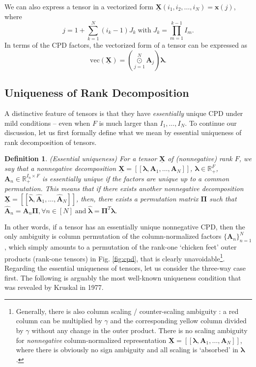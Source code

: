 \documentclass[journal]{IEEEtran}
\newtheorem{Def}{Definition}
\begin{document}
We can also express a tensor in a vectorized form $\underline{\mathbf{X}}(i_1,i_2,\ldots,i_N) = {\mathbf{x}}(j)$, where
\begin{equation*}
j = 1 + \sum_{k=1 }^N (i_k-1) J_k \; \text{with} \; J_k = \prod_{m=1}^{k-1} I_m.
\end{equation*}
In terms of the CPD factors, the vectorized form of a tensor can be expressed as
\begin{equation}
\text{vec}(\underline{\mathbf{X}})=  \left( { \underset{j=1}{ \overset{N}{\odot}}} \mathbf{A}_j \right) \boldsymbol{\lambda}.
\end{equation}

\subsection{Uniqueness of Rank Decomposition}
A distinctive feature of tensors is that they have \emph{essentially} unique CPD under mild conditions -- even when $F$ is much larger than $I_1,\ldots,I_N$.
To continue our discussion, let us first formally define what we mean by essential uniqueness of rank decomposition of tensors.
\begin{Def}
	(Essential uniqueness) For a tensor $\underline{\mathbf{X}}$ of (nonnegative) rank $F$, we say that a nonnegative decomposition $\underline{\mathbf{X}} = [\![{\bm \lambda}, \mathbf{A}_1, \ldots, \mathbf{A}_N ]\!]$, {$\boldsymbol{\lambda} \in \mathbb{R}_+^F$, $\mathbf{A}_n \in \mathbb{R}_+^{I_n \times F}$} is essentially unique if the factors are unique up to a common permutation. This means that if there exists another nonnegative decomposition $\underline{\mathbf{X}} = [\![ \widehat{\boldsymbol{\lambda}},\widehat{\mathbf{A}}_1, \ldots, \widehat{\mathbf{A}}_N ]\!]$, then, there exists a permutation matrix $\boldsymbol{\Pi}$ such that 
$
\widehat{\mathbf{A}}_n = \mathbf{A}_n \boldsymbol{\Pi}, \forall n\in[N] \; \text{and} \; \widehat{\boldsymbol{\lambda}} = \boldsymbol{\Pi}^T \boldsymbol{\lambda}.
$
\end{Def}
In other words, if a tensor has an essentially unique nonnegative CPD, then the only ambiguity is column permutation of the column-normalized factors $\{\mathbf{A}_n\}_{n=1}^N$, which simply amounts to a permutation of the rank-one `chicken feet' outer products (rank-one tensors) in Fig. \ref{fig:cpd}, that is clearly unavoidable\footnote{Generally, there is also column scaling / counter-scaling ambiguity \cite{SiDeFu2017}: a red column can be multiplied by $\gamma$ and the corresponding yellow column divided by $\gamma$ without any change in the outer product. There is no scaling ambiguity for {\em nonnegative} column-normalized representation $\underline{\mathbf{X}} = [\![{\bm \lambda},\mathbf{A}_1, \ldots, \mathbf{A}_N ]\!]$, where there is obviously no sign ambiguity and all scaling is `absorbed' in ${\bm \lambda}$.}.
Regarding the essential uniqueness of tensors, let us consider the {three-way} case first. The following is arguably the most well-known uniqueness condition that was revealed by Kruskal in 1977.
\end{document}

